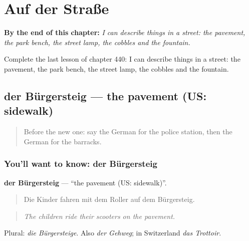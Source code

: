 
\chapter{Auf der Straße}
\label{ch:ge-auf-der-stra-e}

\begin{chapteropening}
\textbf{By the end of this chapter:} \emph{I can describe things in a street: the pavement, the park bench, the street lamp, the cobbles and the fountain.}

Complete the last lesson of chapter 440: I can describe things in a street: the pavement, the park bench, the street lamp, the cobbles and the fountain.
\end{chapteropening}

\section[der Bürgersteig]{der Bürgersteig — the pavement (US: sidewalk)}

\label{lesson:GE-C440-buergersteig}



\begin{quote}
Before the new one: say the German for the police station, then the German for the barracks.
\end{quote}

\subsection*{You'll want to know: der Bürgersteig}
\textbf{der Bürgersteig} — \textquotedblleft{}the pavement (US: sidewalk)\textquotedblright{}.

\begin{quote}
Die Kinder fahren mit dem Roller auf dem Bürgersteig.
\end{quote}

\begin{quote}
\emph{The children ride their scooters on the pavement.}
\end{quote}

Plural: \emph{die Bürgersteige}. Also \emph{der Gehweg}; in Switzerland \emph{das Trottoir}.

